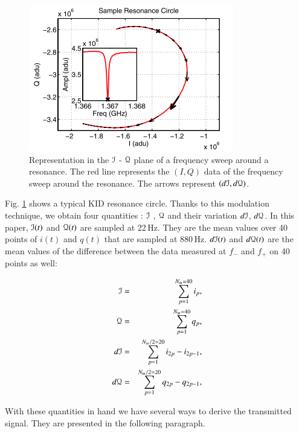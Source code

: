 \begin{figure}[h]
\center
	\includegraphics[clip,angle=0,width=\columnwidth]{Figures/resonance-circle.png}
	\caption{Representation in the $\mathcal{I}$ - $\mathcal{Q}$ plane of a
          frequency sweep around a resonance. The red line represents the
          $(I,Q)$ data of the frequency sweep around the resonance. The arrows
          represent $(d\mathcal{I}, d\mathcal{Q})$. \citep{2013A&A...551L..12C}}
	\label{circle-iq}
\end{figure}

Fig. \ref{circle-iq} shows a typical KID resonance circle. Thanks to this
modulation technique, we obtain four quantities : $\mathcal{I}$ , $\mathcal{Q}$ and their
variation $d\mathcal{I}$, $d\mathcal{Q}$. In this paper, $\mathcal{I}(t)$ and $\mathcal{Q}(t)$ are sampled at
22\,Hz. They are the mean values over 40 points of $i(t)$ and $q(t)$ that are
sampled at 880\,Hz. $d\mathcal{I}(t)$ and $d\mathcal{Q}(t)$ are the mean values of the difference
between the data measured at $f_{-}$ and $f_{+}$ on 40 points as well:

\begin{eqnarray}
\mathcal{I}  &=& \sum^{N_{m}=40}_{p=1} i_{p},\\
\mathcal{Q}  &=& \sum^{N_{m}=40}_{p=1} q_{p},\\
d\mathcal{I} &=& \sum^{N_{m}/2=20}_{p=1} i_{2p} - i_{2p-1},\\
d\mathcal{Q} &=& \sum^{N_{m}/2=20}_{p=1} q_{2p} - q_{2p-1},
\end{eqnarray}


With these quantities in hand we have several ways to derive the transmitted
signal. They are presented in the following paragraph.

